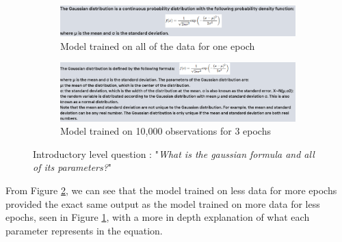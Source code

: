 \documentclass[10pt]{article}
\begin{document}
\begin{figure}[htbp]
    \centering
    \begin{subfigure}[b]{0.45\textwidth}
        \centering
        \includegraphics[width=\textwidth]{Images/1EpochQ1.png}
        \caption{Model trained on all of the data for one epoch}
        \label{fig: Q1_Model1}
    \end{subfigure}
    \hfill
    \begin{subfigure}[b]{0.5\textwidth}
        \centering
        \includegraphics[width=\textwidth]{Images/10kQ1.png}
        \caption{Model trained on 10,000 observations for 3 epochs}
        \label{fig: Q1_Model2}
    \end{subfigure}
    \caption{Introductory level question : "\textit{What is the gaussian formula and all of its parameters?}"}
    \label{fig: Q1}
\end{figure}
From Figure \ref{fig: Q1_Model2}, we can see that the model trained on less data for more epochs
provided the exact same output as the model trained on more data for less epochs, seen
in Figure \ref{fig: Q1_Model1}, with a more in depth explanation of what each parameter
represents in the equation.
\end{document}
